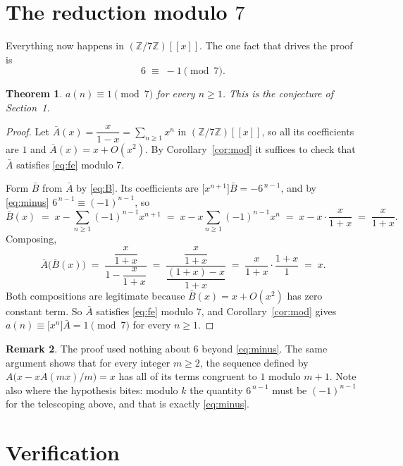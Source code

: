 \documentclass[11pt,a4paper]{article}
\theoremstyle{plain}
\newtheorem{theorem}{Theorem}
\theoremstyle{definition}
\newtheorem{remark}[theorem]{Remark}
\begin{document}
\section{The reduction modulo $7$}

Everything now happens in $(\mathbb{Z}/7\mathbb{Z})[[x]]$. The one fact that drives the proof is
\begin{equation}\label{eq:minus}
6\;\equiv\;-1 \pmod{7} .
\end{equation}

\begin{theorem}\label{thm:main}
$a(n)\equiv1\pmod{7}$ for every $n\ge1$. This is the conjecture of Section~1.
\end{theorem}

\begin{proof}
Let $\bar A(x)=\dfrac{x}{1-x}=\sum_{n\ge1}x^{n}$ in $(\mathbb{Z}/7\mathbb{Z})[[x]]$, so all its
coefficients are $1$ and $\bar A(x)=x+O(x^{2})$. By Corollary~\ref{cor:mod} it suffices to
check that $\bar A$ satisfies \eqref{eq:fe} modulo $7$.

Form $\bar B$ from $\bar A$ by \eqref{eq:B}. Its coefficients are
$\bigl[x^{n+1}\bigr]\bar B=-6^{\,n-1}$, and by \eqref{eq:minus}
$6^{\,n-1}\equiv(-1)^{n-1}$, so
\[
\bar B(x)\;=\;x-\sum_{n\ge1}(-1)^{n-1}x^{n+1}
\;=\;x-x\sum_{n\ge1}(-1)^{n-1}x^{n}
\;=\;x-x\cdot\frac{x}{1+x}
\;=\;\frac{x}{1+x} .
\]
Composing,
\[
\bar A\bigl(\bar B(x)\bigr)\;=\;\frac{\dfrac{x}{1+x}}{1-\dfrac{x}{1+x}}
\;=\;\frac{\dfrac{x}{1+x}}{\dfrac{(1+x)-x}{1+x}}
\;=\;\frac{x}{1+x}\cdot\frac{1+x}{1}\;=\;x .
\]
Both compositions are legitimate because $\bar B(x)=x+O(x^{2})$ has zero constant term.
So $\bar A$ satisfies \eqref{eq:fe} modulo $7$, and Corollary~\ref{cor:mod} gives
$a(n)\equiv\bigl[x^{n}\bigr]\bar A=1\pmod{7}$ for every $n\ge1$.
\end{proof}

\begin{remark}
The proof used nothing about $6$ beyond \eqref{eq:minus}. The same argument shows that
for every integer $m\ge2$, the sequence defined by $A\bigl(x-xA(mx)/m\bigr)=x$ has all of
its terms congruent to $1$ modulo $m+1$. Note also where the hypothesis bites: modulo $k$
the quantity $6^{\,n-1}$ must be $(-1)^{n-1}$ for the telescoping above, and that is
exactly \eqref{eq:minus}.
\end{remark}

\section{Verification}
\end{document}
